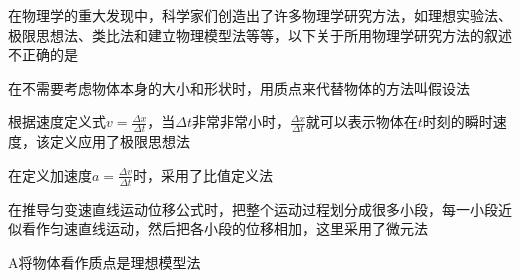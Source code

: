 在物理学的重大发现中，科学家们创造出了许多物理学研究方法，如理想实验法、极限思想法、类比法和建立物理模型法等等，以下关于所用物理学研究方法的叙述不正确的是\paren[A]
\begin{choices}
    \item 在不需要考虑物体本身的大小和形状时，用质点来代替物体的方法叫假设法
    \item 根据速度定义式\(v = \frac{\Delta x}{\Delta t}\)，当\(\Delta t\)非常非常小时，\(\frac{\Delta x}{\Delta t}\)就可以表示物体在\(t\)时刻的瞬时速度，该定义应用了极限思想法
    \item 在定义加速度\(a = \frac{\Delta v}{\Delta t}\)时，采用了比值定义法
    \item 在推导匀变速直线运动位移公式时，把整个运动过程划分成很多小段，每一小段近似看作匀速直线运动，然后把各小段的位移相加，这里采用了微元法
\end{choices}
\begin{answer}
    A\qquad\kaishu 将物体看作质点是理想模型法
\end{answer}